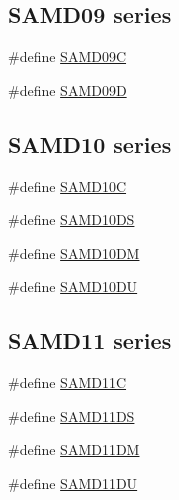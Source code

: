 \subsection*{S\+A\+M\+D09 series}
\begin{DoxyCompactItemize}
\item 
\#define \mbox{\hyperlink{group__sam__part__macros__group_gae85ddac6159db51e09555ec6150a6947}{S\+A\+M\+D09C}}
\item 
\#define \mbox{\hyperlink{group__sam__part__macros__group_ga8209c68b3303de59159dcc7ace291b99}{S\+A\+M\+D09D}}
\end{DoxyCompactItemize}
\subsection*{S\+A\+M\+D10 series}
\begin{DoxyCompactItemize}
\item 
\#define \mbox{\hyperlink{group__sam__part__macros__group_ga1a60c9b9aa605778737b0f61864f274f}{S\+A\+M\+D10C}}
\item 
\#define \mbox{\hyperlink{group__sam__part__macros__group_gaad8cc1805b7c030a384ba343b1fc475f}{S\+A\+M\+D10\+DS}}
\item 
\#define \mbox{\hyperlink{group__sam__part__macros__group_ga99eaa778f98beee6e189a0a649330a47}{S\+A\+M\+D10\+DM}}
\item 
\#define \mbox{\hyperlink{group__sam__part__macros__group_ga697aef1095ce9ad2da295844d802cd1a}{S\+A\+M\+D10\+DU}}
\end{DoxyCompactItemize}
\subsection*{S\+A\+M\+D11 series}
\begin{DoxyCompactItemize}
\item 
\#define \mbox{\hyperlink{group__sam__part__macros__group_ga04267f2c27b0e5c265d7cf75e41728b5}{S\+A\+M\+D11C}}
\item 
\#define \mbox{\hyperlink{group__sam__part__macros__group_ga5a5c9017efa9764ece7e1e7fee1f5866}{S\+A\+M\+D11\+DS}}
\item 
\#define \mbox{\hyperlink{group__sam__part__macros__group_gaa3d39f43fd1dfb13a8e3769dadd3a3b2}{S\+A\+M\+D11\+DM}}
\item 
\#define \mbox{\hyperlink{group__sam__part__macros__group_gaf49d4f8c4df8247e3b09f8c5369589a5}{S\+A\+M\+D11\+DU}}
\end{DoxyCompactItemize}
